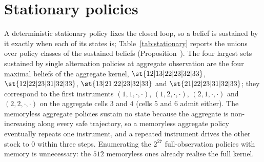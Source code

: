 \section{Stationary policies}\label{si:stationary}

A deterministic stationary policy fixes the closed loop, so a belief is sustained by it exactly when each of its states is; Table~\ref{tab:stationary} reports the unions over policy classes of the sustained beliefs (Proposition~). The four largest sets sustained by single alternation policies at aggregate observation are the four maximal beliefs of the aggregate kernel, $\st{12|13|22|23|32|33}$, $\st{12|22|23|31|32|33}$, $\st{13|21|22|23|32|33}$ and $\st{21|22|23|31|32|33}$; they correspond to the first instruments $(1,1,\cdot,\cdot)$, $(1,2,\cdot,\cdot)$, $(2,1,\cdot,\cdot)$ and $(2,2,\cdot,\cdot)$ on the aggregate cells $3$ and $4$ (cells $5$ and $6$ admit either). The memoryless aggregate policies sustain no state because the aggregate is non-increasing along every safe trajectory, so a memoryless aggregate policy eventually repeats one instrument, and a repeated instrument drives the other stock to $0$ within three steps. Enumerating the $2^{27}$ full-observation policies with memory is unnecessary: the $512$ memoryless ones already realise the full kernel.


